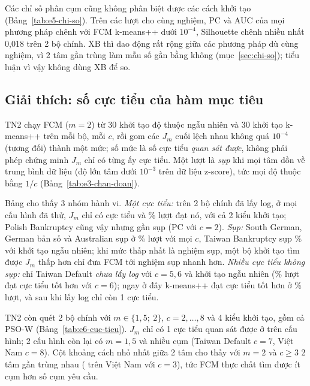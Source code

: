 

Các chỉ số phân cụm cũng không phân biệt được các cách khởi tạo (Bảng~\ref{tab:e5-chi-so}). Trên các lượt cho cùng nghiệm,
PC và AUC của mọi phương pháp chênh với FCM k-means++ dưới $10^{-4}$, Silhouette chênh nhiều nhất 0,018 trên 2 bộ chính.
XB thì dao động rất rộng giữa các phương pháp dù cùng nghiệm, vì 2 tâm gần trùng làm mẫu số gần bằng không
(mục~\ref{sec:chi-so}); tiểu luận vì vậy không dùng XB để so.
\label{sec:e5-chi-so}



\subsection{Giải thích: số cực tiểu của hàm mục tiêu}
\label{sec:vi-sao}

TN2 chạy FCM ($m = 2$) từ 30 khởi tạo độ thuộc ngẫu nhiên và 30 khởi tạo k-means++ trên mỗi bộ, mỗi $c$, rồi gom các $J_m$
cuối lệch nhau không quá $10^{-4}$ (tương đối) thành một mức; số mức là số cực tiểu \emph{quan sát được}, không phải phép chứng
minh $J_m$ chỉ có từng ấy cực tiểu. Một lượt là \emph{sụp} khi mọi tâm dồn về trung bình dữ liệu (độ lớn tâm dưới $10^{-3}$
trên dữ liệu z-score), tức mọi độ thuộc bằng $1/c$ (Bảng~\ref{tab:e3-chan-doan}).



Bảng cho thấy 3 nhóm hành vi. \emph{Một cực tiểu:} trên 2 bộ chính đã lấy log, ở mọi cấu hình đã thử, $J_m$ chỉ có
\soLieuEBaTaiwanKiemChungCSauUNgauNhienSoCucTieu{} cực tiểu và \soLieuEBaTaiwanKiemChungCSauUNgauNhienDatJ\% lượt đạt nó, với cả
2 kiểu khởi tạo; Polish Bankruptcy cũng vậy nhưng gần sụp (PC \soLieuEBaPolishCHaiUNgauNhienPc{} với $c = 2$). \emph{Sụp:}
South German, German bản số và Australian sụp ở \soLieuEBaSouthGermanCHaiUNgauNhienSup\% lượt với mọi $c$, Taiwan Bankruptcy
sụp \soLieuEBaTaiwanPhaSanCHaiUNgauNhienSup\% với khởi tạo ngẫu nhiên; khi mức thấp nhất là nghiệm sụp, một bộ khởi tạo tìm được
$J_m$ thấp hơn chỉ đưa FCM tới nghiệm sụp nhanh hơn. \emph{Nhiều cực tiểu không sụp:} chỉ Taiwan Default \emph{chưa lấy log}
với $c = 5, 6$ và khởi tạo ngẫu nhiên (\soLieuEBaTaiwanKiemChungKhongLogCSauUNgauNhienDatJ\% lượt đạt cực tiểu tốt hơn với
$c = 6$); ngay ở đây k-means++ đạt cực tiểu tốt hơn ở \soLieuEBaTaiwanKiemChungKhongLogCSauKmeansPpDatJ\% lượt, và sau khi lấy
log chỉ còn 1 cực tiểu.

TN2 còn quét 2 bộ chính với $m \in \{1{,}5;\ 2\}$, $c = 2, \dots, 8$ và 4 kiểu khởi tạo, gồm cả PSO-W
(Bảng~\ref{tab:e6-cuc-tieu}). $J_m$ chỉ có 1 cực tiểu quan sát được ở \soLieuESauSoCauHinhMotCucTieu{} trên
\soLieuESauSoCauHinh{} cấu hình; 2 cấu hình còn lại có $m = 1{,}5$ và nhiều cụm (Taiwan Default $c = 7$, Việt Nam $c = 8$).
Cột khoảng cách nhỏ nhất giữa 2 tâm cho thấy với $m = 2$ và $c \ge 3$ 2 tâm gần trùng nhau
(\soLieuESauVietNamMHaiPhayKhongCBaKcTam{} trên Việt Nam với $c = 3$), tức FCM thực chất tìm được ít cụm hơn số cụm yêu cầu.

